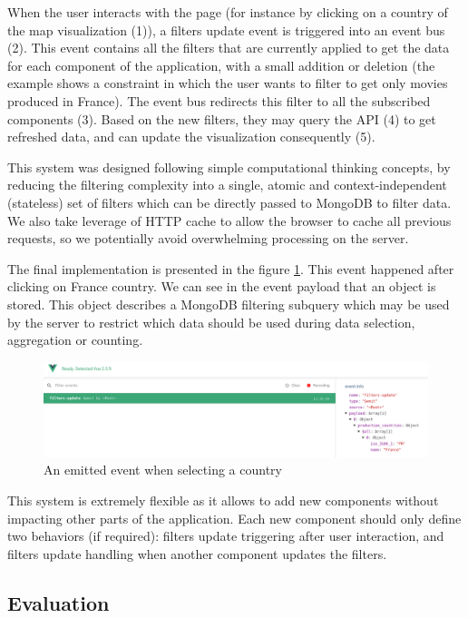 \documentclass[a4paper,10pt]{article}
\begin{document}
When the user interacts with the page (for instance by clicking on a country of the
map visualization (1)), a filters update event is triggered into an event bus (2). This
event contains all the filters that are currently applied to get the data for each
component of the application, with a small addition or deletion (the example shows
a constraint in which the user wants to filter to get only movies produced in France).
The event bus redirects this filter to all the subscribed components (3). Based on
the new filters, they may query the API (4) to get refreshed data, and can update
the visualization consequently (5).

This system was designed following simple computational thinking concepts, by reducing
the filtering complexity into a single, atomic and context-independent (stateless) set of filters which can be directly
passed to MongoDB to filter data. We also take leverage of HTTP cache to allow
the browser to cache all previous requests, so we potentially avoid overwhelming processing
on the server.

The final implementation is presented in the figure \ref{fig:screen-filtering}.
This event happened after clicking on France country. We can see in the event
payload that an object is stored. This object describes a MongoDB filtering subquery
which may be used by the server to restrict which data should be used during data
selection, aggregation or counting.

\begin{figure}[ht]
   \centering
   \includegraphics[width=1\linewidth]{images/screens/filtering-example.png}
  \caption{An emitted event when selecting a country} \label{fig:screen-filtering}
\end{figure}

This system is extremely flexible as it allows to add new components without impacting
other parts of the application. Each new component should only define two behaviors (if required):
filters update triggering after user interaction, and filters update handling when
another component updates the filters.

\subsection{Evaluation}
\end{document}
